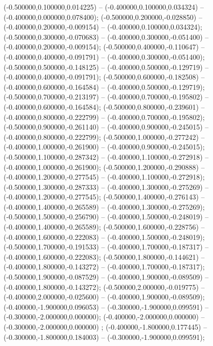  (-0.500000,0.100000,0.014225) -- (-0.400000,0.100000,0.034324) -- (-0.400000,0.000000,0.078400);
 (-0.500000,0.200000,-0.028850) -- (-0.400000,0.200000,-0.009154) -- (-0.400000,0.100000,0.034324);
 (-0.500000,0.300000,-0.070683) -- (-0.400000,0.300000,-0.051400) -- (-0.400000,0.200000,-0.009154);
 (-0.500000,0.400000,-0.110647) -- (-0.400000,0.400000,-0.091791) -- (-0.400000,0.300000,-0.051400);
 (-0.500000,0.500000,-0.148125) -- (-0.400000,0.500000,-0.129719) -- (-0.400000,0.400000,-0.091791);
 (-0.500000,0.600000,-0.182508) -- (-0.400000,0.600000,-0.164584) -- (-0.400000,0.500000,-0.129719);
 (-0.500000,0.700000,-0.213197) -- (-0.400000,0.700000,-0.195802) -- (-0.400000,0.600000,-0.164584);
 (-0.500000,0.800000,-0.239601) -- (-0.400000,0.800000,-0.222799) -- (-0.400000,0.700000,-0.195802);
 (-0.500000,0.900000,-0.261140) -- (-0.400000,0.900000,-0.245015) -- (-0.400000,0.800000,-0.222799);
 (-0.500000,1.000000,-0.277242) -- (-0.400000,1.000000,-0.261900) -- (-0.400000,0.900000,-0.245015);
 (-0.500000,1.100000,-0.287342) -- (-0.400000,1.100000,-0.272918) -- (-0.400000,1.000000,-0.261900);
 (-0.500000,1.200000,-0.290888) -- (-0.400000,1.200000,-0.277545) -- (-0.400000,1.100000,-0.272918);
 (-0.500000,1.300000,-0.287333) -- (-0.400000,1.300000,-0.275269) -- (-0.400000,1.200000,-0.277545);
 (-0.500000,1.400000,-0.276143) -- (-0.400000,1.400000,-0.265589) -- (-0.400000,1.300000,-0.275269);
 (-0.500000,1.500000,-0.256790) -- (-0.400000,1.500000,-0.248019) -- (-0.400000,1.400000,-0.265589);
 (-0.500000,1.600000,-0.228756) -- (-0.400000,1.600000,-0.222083) -- (-0.400000,1.500000,-0.248019);
 (-0.500000,1.700000,-0.191533) -- (-0.400000,1.700000,-0.187317) -- (-0.400000,1.600000,-0.222083);
 (-0.500000,1.800000,-0.144621) -- (-0.400000,1.800000,-0.143272) -- (-0.400000,1.700000,-0.187317);
 (-0.500000,1.900000,-0.087529) -- (-0.400000,1.900000,-0.089509) -- (-0.400000,1.800000,-0.143272);
 (-0.500000,2.000000,-0.019775) -- (-0.400000,2.000000,-0.025600) -- (-0.400000,1.900000,-0.089509);
 (-0.400000,-1.900000,0.096053) -- (-0.300000,-1.900000,0.099591) -- (-0.300000,-2.000000,0.000000);
 (-0.400000,-2.000000,0.000000) -- (-0.300000,-2.000000,0.000000) ;
 (-0.400000,-1.800000,0.177445) -- (-0.300000,-1.800000,0.184003) -- (-0.300000,-1.900000,0.099591);
